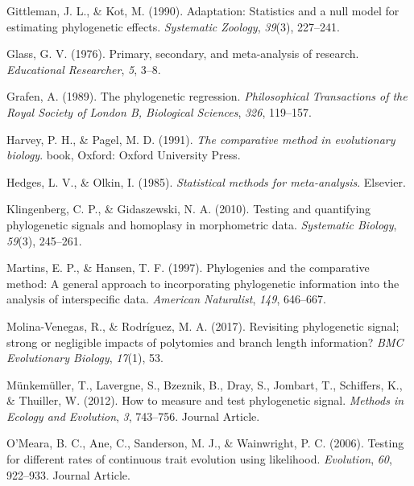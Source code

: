 \documentclass[
]{article}
\newlength{\cslhangindent}
\newenvironment{CSLReferences}[2] %
 {%
  \setlength{\parindent}{0pt}
  \ifodd #1 \everypar{\setlength{\hangindent}{\cslhangindent}}\ignorespaces\fi
  \ifnum #2 > 0
  \setlength{\parskip}{#2\baselineskip}
  \fi
 }%
 {}
\begin{document}
\begin{CSLReferences}{1}{0}
\leavevmode{}%
Gittleman, J. L., \& Kot, M. (1990). Adaptation: Statistics and a null
model for estimating phylogenetic effects. \emph{Systematic Zoology},
\emph{39}(3), 227--241.

\leavevmode{}%
Glass, G. V. (1976). Primary, secondary, and meta-analysis of research.
\emph{Educational Researcher}, \emph{5}, 3--8.

\leavevmode{}%
Grafen, A. (1989). The phylogenetic regression. \emph{Philosophical
Transactions of the Royal Society of London B, Biological Sciences},
\emph{326}, 119--157.

\leavevmode{}%
Harvey, P. H., \& Pagel, M. D. (1991). \emph{The comparative method in
evolutionary biology}. book, Oxford: Oxford University Press.

\leavevmode{}%
Hedges, L. V., \& Olkin, I. (1985). \emph{Statistical methods for
meta-analysis}. Elsevier.

\leavevmode{}%
Klingenberg, C. P., \& Gidaszewski, N. A. (2010). Testing and
quantifying phylogenetic signals and homoplasy in morphometric data.
\emph{Systematic Biology}, \emph{59}(3), 245--261.

\leavevmode{}%
Martins, E. P., \& Hansen, T. F. (1997). Phylogenies and the comparative
method: A general approach to incorporating phylogenetic information
into the analysis of interspecific data. \emph{American Naturalist},
\emph{149}, 646--667.

\leavevmode{}%
Molina-Venegas, R., \& Rodríguez, M. A. (2017). Revisiting phylogenetic
signal; strong or negligible impacts of polytomies and branch length
information? \emph{BMC Evolutionary Biology}, \emph{17}(1), 53.

\leavevmode{}%
Münkemüller, T., Lavergne, S., Bzeznik, B., Dray, S., Jombart, T.,
Schiffers, K., \& Thuiller, W. (2012). How to measure and test
phylogenetic signal. \emph{Methods in Ecology and Evolution}, \emph{3},
743--756. Journal Article.

\leavevmode{}%
O'Meara, B. C., Ane, C., Sanderson, M. J., \& Wainwright, P. C. (2006).
Testing for different rates of continuous trait evolution using
likelihood. \emph{Evolution}, \emph{60}, 922--933. Journal Article.


\end{CSLReferences}
\end{document}
